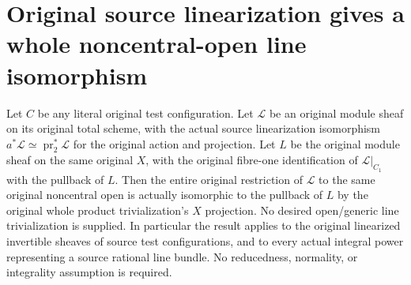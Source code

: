 \section{Original source linearization gives a whole noncentral-open line isomorphism}
\label{sec:native-test-configuration-line-trivialization}

\begin{theorem}
\label{thm:native-test-configuration-line-trivialization}
\leanok
{}
Let $C$ be any literal original test configuration. Let $\mathcal L$
be an original module sheaf on its original total scheme, with
the actual source linearization isomorphism
$a^*\mathcal L\simeq\operatorname{pr}_2^*\mathcal L$ for the
original action and projection. Let $L$ be the original module
sheaf on the same original $X$, with the original fibre-one
identification of $\mathcal L|_{C_1}$ with the pullback of $L$.
Then the entire original restriction of $\mathcal L$ to the
same original noncentral open is actually isomorphic to the
pullback of $L$ by the original whole product trivialization's
$X$ projection. No desired open/generic line trivialization is
supplied. In particular the result applies to the original
linearized invertible sheaves of source test configurations,
and to every actual integral power representing a source
rational line bundle. No reducedness, normality, or integrality
assumption is required.
\end{theorem}

